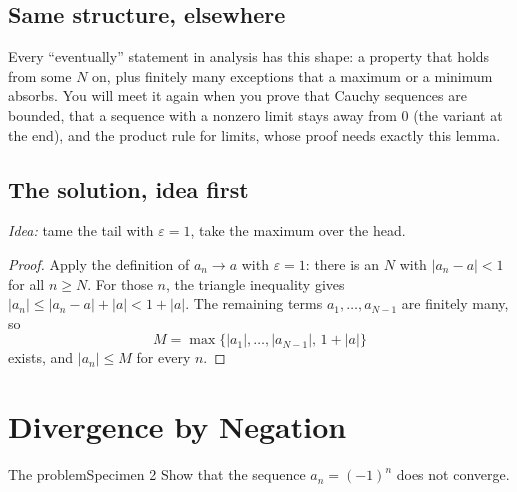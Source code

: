 \documentclass{kaelearn}
\begin{document}
\subsection{Same structure, elsewhere}
Every ``eventually'' statement in analysis has this shape: a property that holds from some $N$ on,
plus finitely many exceptions that a maximum or a minimum absorbs. You will meet it again when you
prove that Cauchy sequences are bounded, that a sequence with a nonzero limit stays away from $0$
(the variant at the end), and the product rule for limits, whose proof needs exactly this lemma.



\subsection{The solution, idea first}
\emph{Idea:} tame the tail with $\varepsilon=1$, take the maximum over the head.
\begin{proof}
Apply the definition of $a_n\to a$ with $\varepsilon=1$: there is an $N$ with $|a_n-a|<1$ for all
$n\ge N$. For those $n$, the triangle inequality gives $|a_n|\le|a_n-a|+|a|<1+|a|$. The remaining
terms $a_1,\dots,a_{N-1}$ are finitely many, so
\[M=\max\{|a_1|,\dots,|a_{N-1}|,\,1+|a|\}\]
exists, and $|a_n|\le M$ for every $n$.
\end{proof}

\section{Divergence by Negation}

\begin{panel}[unbreakable]{The problem}{Specimen 2}{}
Show that the sequence $a_n=(-1)^n$ does not converge.
\end{panel}
\end{document}
